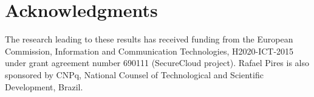 \documentclass[sigconf,table]{acmart}
\begin{document}

\maketitle

















\section*{Acknowledgments}
The research leading to these results has received funding from the European Commission, Information and Communication Technologies, H2020-ICT-2015 under grant agreement number 690111 (SecureCloud project).
Rafael Pires is also sponsored by CNPq, National Counsel of Technological and Scientific Development, Brazil.

{


}
\end{document}
